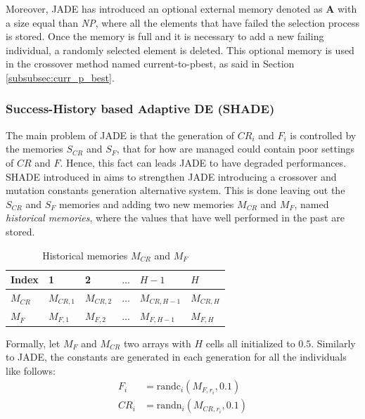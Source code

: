 Moreover, JADE has introduced an optional external memory denoted as \textbf{A} with a size equal than \textit{NP}, where all the elements that have failed the selection process is stored. Once the memory is full and it is necessary to add a new failing individual, a randomly selected element is deleted. This optional memory is used in the crossover method named current-to-pbest, as said in Section \ref{subsubsec:curr_p_best}.

\subsubsection{Success-History based Adaptive DE (SHADE)}
The main problem of JADE is that the generation of $\textit{CR}_{i}$ and $F_{i}$ is controlled by the memories $S_{\textit{CR}}$ and $S_{F}$, that for how are managed could contain poor settings of $\textit{CR}$ and $F$. Hence, this fact can leads JADE to have degraded performances.\newline\newline
SHADE introduced in \cite{SHADE:2013} aims to strengthen JADE introducing a crossover and mutation constants generation alternative system. This is done leaving out the $S_{\textit{CR}}$ and $S_{F}$ memories and adding two new memories $M_{\textit{CR}}$ and $M_{F}$, named \textit{historical memories}, where the values that have well performed in the past are stored.
\begin{table}[t]
	\centering
	\begin{tabular}{|l|l|l|l|l|l|}
		\hline
		Index             & 1                   & 2                   & $\dots$ & $H -1$                & $H$                 \\ 
		\hline
		$M_{\textit{CR}}$ & $M_{\textit{CR},1}$ & $M_{\textit{CR},2}$ & $\dots$ & $M_{\textit{CR},H-1}$ & $M_{\textit{CR},H}$ \\ 
		\hline
		$M_{F}$           & $M_{F, 1}$          & $M_{F, 2}$          & $\dots$ & $M_{F, H-1}$          & $M_{F, H}$          \\ 
		\hline
	\end{tabular}
	\caption{Historical memories $M_{\textit{CR}}$ and $M_{F}$}
\end{table}
Formally, let $M_{F}$ and $M_{\textit{CR}}$ two arrays with $H$ cells all initialized to $0.5$. Similarly to JADE, the constants are generated in each generation for all the individuals like follows:
\begin{align}
	F_i &= \textrm{randc}_{i}(M_{F, r_{i}}, 0.1) \\
	\textit{CR}_i &= \textrm{randn}_{i}(M_{\textit{CR},r_{i}}, 0.1)
\end{align}
